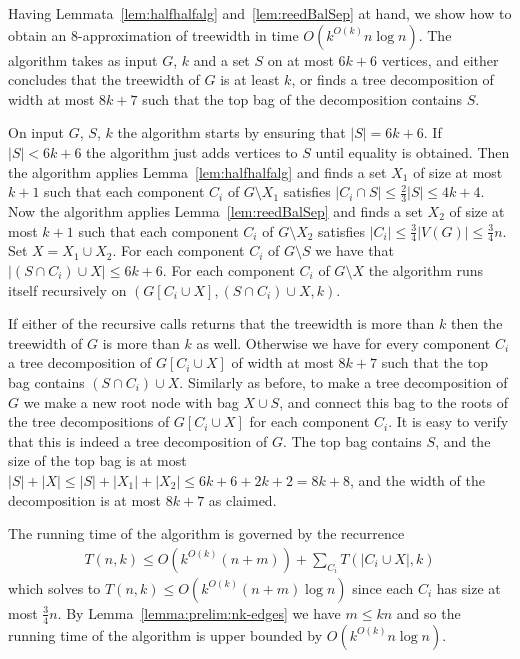 \documentclass[a4paper,11pt]{article}
\theoremstyle{definition}
\theoremstyle{remark}
\begin{document}
Having Lemmata~\ref{lem:halfhalfalg} and~\ref{lem:reedBalSep} at hand,
we show how to obtain an $8$-approximation of treewidth in time
$O(k^{O(k)}n\log n)$.  The algorithm takes as input $G$, $k$ and a set
$S$ on at most $6k+6$ vertices, and either concludes that the
treewidth of $G$ is at least $k$, or finds a tree decomposition of
width at most $8k+7$ such that the top bag of the decomposition
contains $S$.

On input $G$, $S$, $k$ the algorithm starts by ensuring that
$|S|=6k+6$.  If $|S| < 6k+6$ the algorithm just adds vertices to $S$
until equality is obtained.  Then the algorithm applies
Lemma~\ref{lem:halfhalfalg} and finds a set $X_1$ of size at most
$k+1$ such that each component $C_i$ of $G \setminus X_1$ satisfies
$|C_i \cap S| \leq \frac{2}{3}|S| \leq 4k+4$.  Now the algorithm
applies Lemma~\ref{lem:reedBalSep} and finds a set $X_2$ of size at
most $k+1$ such that each component $C_i$ of $G \setminus X_2$
satisfies $|C_i| \leq \frac{3}{4}|V(G)| \leq \frac{3}{4}n$.  Set $X =
X_1 \cup X_2$.  For each component $C_i$ of $G \setminus S$ we have
that $|(S \cap C_i) \cup X| \leq 6k+6$.  For each component $C_i$ of
$G \setminus X$ the algorithm runs itself recursively on $(G[C_i \cup
X], (S \cap C_i) \cup X, k)$.

If either of the recursive calls returns that the treewidth is more
than $k$ then the treewidth of $G$ is more than $k$ as well.
Otherwise we have for every component $C_i$ a tree decomposition of
$G[C_i \cup X]$ of width at most $8k+7$ such that the top bag contains
$(S \cap C_i) \cup X$.  Similarly as before, to make a tree
decomposition of $G$ we make a new root node with bag $X \cup S$, and
connect this bag to the roots of the tree decompositions of $G[C_i
\cup X]$ for each component $C_i$.  It is easy to verify that this is
indeed a tree decomposition of $G$.  The top bag contains $S$, and the
size of the top bag is at most $|S|+|X| \leq |S| + |X_1| + |X_2| \leq
6k + 6 + 2k + 2 = 8k + 8$, and the width of the decomposition is at
most $8k+7$ as claimed.

The running time of the algorithm is governed by the recurrence
\begin{align}\label{eqn:reedTime}
  T(n,k) \leq O\left(k^{O(k)}(n+m)\right) + \sum_{C_i} T(|C_i \cup X|, k)
\end{align}
which solves to $T(n,k) \leq O(k^{O(k)}(n+m)\log n)$ since each $C_i$ has
size at most $\frac{3}{4}n$.  By Lemma~\ref{lemma:prelim:nk-edges} we
have $m \leq kn$ and so the running time of the algorithm is upper
bounded by $O(k^{O(k)}n\log n)$.
\end{document}
